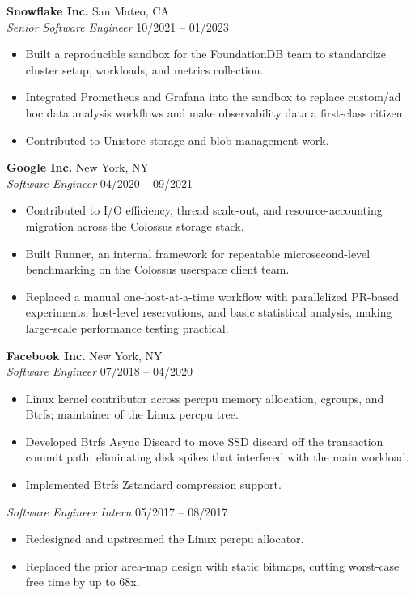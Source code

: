\documentclass[10pt]{article}
\newcommand{\resumeRole}[4]{
  \textbf{#1} \hfill #4 \\
  \textit{#3} \hfill #2\par
  \vspace{0.02em}
}
\begin{document}
\resumeRole{Snowflake Inc.}{10/2021 -- 01/2023}{Senior Software Engineer}{San Mateo, CA}
\begin{itemize}
\item Built a reproducible sandbox for the FoundationDB team to
standardize cluster setup, workloads, and metrics collection.
\item Integrated Prometheus and Grafana into the sandbox to
replace custom/ad hoc data analysis workflows and make observability data a first-class
citizen.
\item Contributed to Unistore storage and blob-management work.
\end{itemize}

\resumeRole{Google Inc.}{04/2020 -- 09/2021}{Software Engineer}{New York, NY}
\begin{itemize}
\item Contributed to I/O efficiency, thread scale-out, and
resource-accounting migration across the Colossus storage stack.
\item Built Runner, an internal framework for repeatable microsecond-level
benchmarking on the Colossus userspace client team.
\item Replaced a manual one-host-at-a-time workflow with parallelized
PR-based experiments, host-level reservations, and basic statistical analysis,
making large-scale performance testing practical.
\end{itemize}

\resumeRole{Facebook Inc.}{07/2018 -- 04/2020}{Software Engineer}{New York, NY}
\begin{itemize}
\item Linux kernel contributor across percpu memory allocation, cgroups, and
Btrfs; maintainer of the Linux percpu tree.
\item Developed Btrfs Async Discard to move SSD discard off the transaction
commit path, eliminating disk spikes that interfered with the main workload.
\item Implemented Btrfs Zstandard compression support.
\end{itemize}

\textit{Software Engineer Intern} \hfill 05/2017 -- 08/2017\par
\vspace{0.02em}
\begin{itemize}
\item Redesigned and upstreamed the Linux percpu allocator.
\item Replaced the prior area-map design with static bitmaps, cutting
worst-case free time by up to 68x.
\end{itemize}
\end{document}
